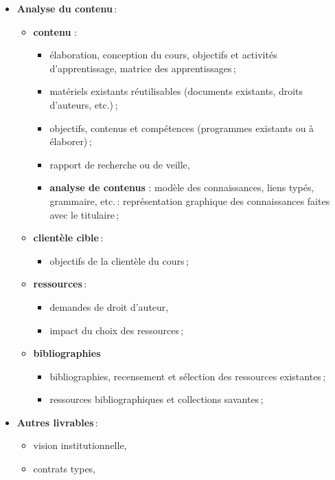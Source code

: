 \begin{frame}[allowframebreaks]
\begin{itemize}
							\item \textbf{Analyse du contenu}\,: 
								\begin{itemize}
								\item \textbf{contenu }: 
									\begin{itemize}
									\item élaboration, conception du cours, objectifs et activités d’apprentissage, matrice des apprentissages\,;
									\item matériels existants réutilisables (documents existants, droits d’auteurs, etc.)\,;
									\item objectifs, contenus et compétences (programmes existants ou à élaborer)\,;
									\item rapport de recherche ou de veille, 
									\item \textbf{analyse de contenus }: modèle des connaissances, liens typés, grammaire, etc.\,: représentation graphique des connaissances faites avec le titulaire\,;
									\end{itemize}
								\item \textbf{clientèle cible}\,:
									\begin{itemize}
									\item objectifs de la clientèle du cours\,;
									\end{itemize}
								\item \textbf{ressources}\,: 
									\begin{itemize}
									\item demandes de droit d’auteur, 
									\item impact du choix des ressources\,;
									\end{itemize}
								\item \textbf{bibliographies}
									\begin{itemize}
									\item bibliographies, recensement et sélection des ressources existantes\,;
									\item ressources bibliographiques et collections savantes\,;
									\end{itemize}
								\end{itemize}
							\item \textbf{Autres livrables}\,: 
								\begin{itemize}
								\item vision institutionnelle,
								\item contrats types,
								\end{itemize}
							\framebreak
							\end{itemize}	
												
					\end{frame}

